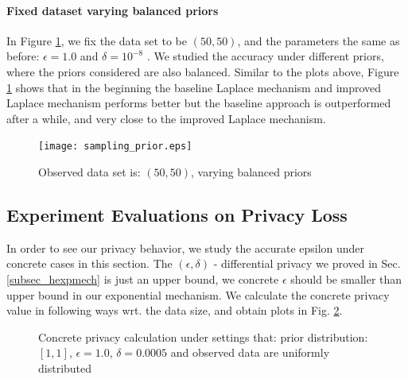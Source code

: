 \documentclass{article}
\begin{document}
\paragraph{Fixed dataset varying balanced priors}
\label{subsubsec_vs_prior}
In Figure \ref{fig_vs_prior}, we fix the data set to be $(50,50)$, and the parameters the same as before: $\epsilon = 1.0$ and $\delta = 10^{-8}$ . We studied the accuracy under different priors, where the priors considered  are also balanced.
Similar to the plots above, Figure \ref{fig_vs_prior} shows that in the beginning the baseline Laplace mechanism and improved Laplace mechanism performs better but the baseline approach is outperformed after a while, and very close to the improved Laplace mechanism.
\begin{figure}
\centering
\texttt{[image: sampling\_prior.eps]}
\caption{Observed data set is: $(50,50)$, varying balanced priors}
\label{fig_vs_prior}
\end{figure}

\subsection{Experiment Evaluations on Privacy Loss}
\label{subsec_experiment_privacy}
In order to see our privacy behavior, we study the accurate epsilon under concrete cases in this section. The $(\epsilon, \delta)$ - differential privacy we proved in Sec. \ref{subsec_hexpmech} is just an upper bound, we concrete $\epsilon$ should be smaller than upper bound in our exponential mechanism. We calculate the concrete privacy value in following ways wrt. the data size, and obtain plots in Fig. \ref{fig_privacy}.

\begin{figure}
\begin{center}
\centering
\caption{Concrete privacy calculation under settings that: prior distribution:$[1,1]$, $\epsilon = 1.0$, $\delta = 0.0005$ and observed data are uniformly distributed}
\label{fig_privacy}
\end{center}
\end{figure}
\end{document}
